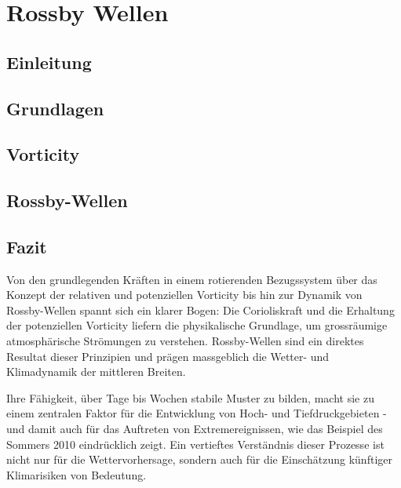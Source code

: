 %
%
%

\chapter{Rossby Wellen\label{chapter:rossby}}
\begin{refsection}

    \section{Einleitung}
    
    \section{Grundlagen}
    
    \section{Vorticity}
    
    \section{Rossby-Wellen}
    


	\section{Fazit}

	Von den grundlegenden Kräften in einem rotierenden Bezugssystem über das Konzept der relativen und potenziellen Vorticity bis hin zur Dynamik von Rossby-Wellen spannt sich ein klarer Bogen:
	Die Corioliskraft und die Erhaltung der potenziellen Vorticity liefern die physikalische Grundlage, um grossräumige atmosphärische Strömungen zu verstehen.
	Rossby-Wellen sind ein direktes Resultat dieser Prinzipien und prägen massgeblich die Wetter- und Klimadynamik der mittleren Breiten.

	Ihre Fähigkeit, über Tage bis Wochen stabile Muster zu bilden, macht sie zu einem zentralen Faktor für die Entwicklung von Hoch- und Tiefdruckgebieten - und damit auch für das Auftreten von Extremereignissen, wie das Beispiel des Sommers 2010 eindrücklich zeigt.
	Ein vertieftes Verständnis dieser Prozesse ist nicht nur für die Wettervorhersage, sondern auch für die Einschätzung künftiger Klimarisiken von Bedeutung.


	\printbibliography[heading=subbibliography]
\end{refsection}
